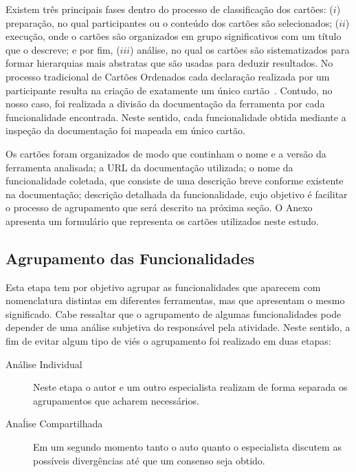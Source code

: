 Existem três principais fases dentro do processo de classificação dos cartões:
($i$) preparação, no qual participantes ou o conteúdo dos cartões são selecionados;
($ii$) execução, onde o cartões são organizados em grupo significativos com um
título que o descreve; e por fim, ($iii$) análise, no qual os cartões são
sistematizados para formar hierarquias mais abstratas que são usadas para
deduzir resultados. No processo tradicional de Cartões Ordenados cada declaração
realizada por um participante resulta na criação de exatamente um único
cartão~\cite{just2008towards}. Contudo, no nosso caso, foi realizada a divisão
da documentação da ferramenta por cada funcionalidade encontrada. Neste sentido,
cada funcionalidade obtida mediante a inspeção da documentação foi mapeada em
único cartão.

Os cartões foram organizados de modo que continham o nome e a versão da
ferramenta analisada; a URL da documentação utilizada; o nome da funcionalidade
coletada, que consiste de uma descrição breve conforme existente na
documentação; descrição detalhada da funcionalidade, cujo objetivo é facilitar o
processo de agrupamento que será descrito na próxima seção. O
Anexo~\cite{ch:app-form-cartoes-ordenados} apresenta um formulário que
representa os cartões utilizados neste estudo.

\subsection{Agrupamento das Funcionalidades}
\label{subsec:agrupamento_fucionalidades}

Esta etapa tem por objetivo agrupar as funcionalidades que aparecem com
nomenclatura distintas em diferentes ferramentas, mas que apresentam o mesmo
significado. Cabe ressaltar que o agrupamento de algumas funcionalidades pode
depender de uma análise subjetiva do responsável pela atividade. Neste sentido,
a fim de evitar algum tipo de viés o agrupamento foi realizado em duas etapas:

\begin{description}
	\item[Análise Individual] Neste etapa o autor e um outro especialista
		realizam de forma separada os agrupamentos que acharem necessários.
	\item[Anaĺise Compartilhada] Em um segundo momento tanto o auto quanto o
		especialista discutem as possíveis divergências até que um consenso seja
		obtido.
\end{description}


